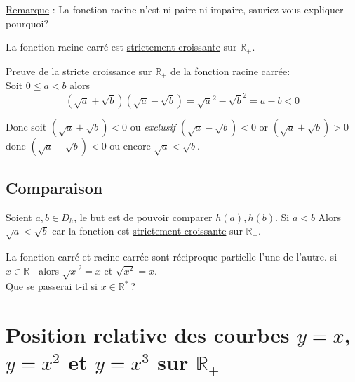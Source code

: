 \documentclass[french]{book}
\begin{document}
\begin{center}
\end{center}





\underline{Remarque} : La fonction racine n'est ni paire ni impaire, sauriez-vous expliquer pourquoi?


\begin{prop}
La fonction racine carré est \underline{strictement croissante} sur $\mathbb{R}_+$. 
\end{prop}

\begin{demo}

Preuve de la stricte croissance sur $\mathbb{R}_+$ de la fonction racine carrée:\\

Soit $0\leq a<b$ alors $$(\sqrt{a}+\sqrt{b})(\sqrt{a}-\sqrt{b})=\sqrt{a}^2 -\sqrt{b}^2=a-b <0$$

Donc soit $(\sqrt{a}+\sqrt{b})<0$ ou \emph{exclusif} $(\sqrt{a}-\sqrt{b})<0$  or  $(\sqrt{a}+\sqrt{b})>0$ donc $(\sqrt{a}-\sqrt{b})<0$ ou encore $\sqrt{a}<\sqrt{b}$.

\end{demo}



\subsection*{Comparaison}
Soient $a,b \in D_h$, le but est de pouvoir comparer $h(a),h(b)$.
Si $a<b$ Alors $\sqrt{a}<\sqrt{b}$ car la fonction est \underline{strictement croissante} sur $\mathbb{R}_+$.


\begin{prop}
La fonction carré et racine carrée sont réciproque partielle l'une de l'autre. si $x \in \mathbb{R}_+$ alors $\sqrt{x}^2=x$ et $\sqrt{x^2}=x$.\\
 
Que se passerai t-il si $x \in \mathbb{R}_-^*$?
\end{prop}


\section{Position relative des courbes $y=x$, $y=x^2$ et $y=x^3$ sur $\mathbb{R}_+$}
\end{document}
